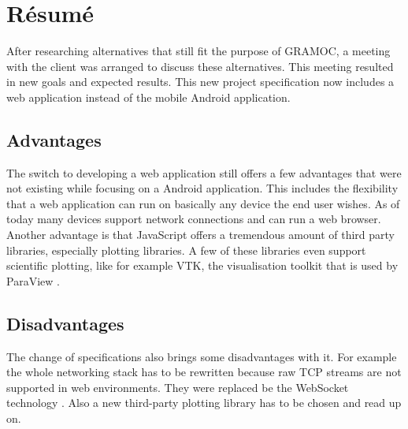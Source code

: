 \chapter{Résumé}

\author{Nico Kratky}
%
After researching alternatives that still fit the purpose of GRAMOC, a meeting with the client was arranged to discuss these alternatives. This meeting resulted in new goals and expected results. This new project specification now includes a web application instead of the mobile Android application.

\section{Advantages}
The switch to developing a web application still offers a few advantages that were not existing while focusing on a Android application. This includes the flexibility that a web application can run on basically any device the end user wishes. As of today many devices support network connections and can run a web browser. Another advantage is that JavaScript offers a tremendous amount of third party libraries, especially plotting libraries. A few of these libraries even support scientific plotting, like for example VTK, the visualisation toolkit that is used by ParaView \autocite{VTK}.

\section{Disadvantages}
The change of specifications also brings some disadvantages with it. For example the whole networking stack has to be rewritten because raw TCP streams are not supported in web environments. They were replaced be the WebSocket technology \autocite{rfc6455}. Also a new third-party plotting library has to be chosen and read up on.
